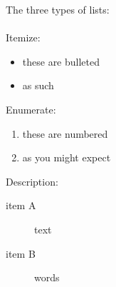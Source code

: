 \documentclass{article}
\begin{document}
The three types of lists:\\\\
Itemize:
\begin{itemize}
  \item these are bulleted
  \item as such
\end{itemize}
Enumerate:
\begin{enumerate}
  \item these are numbered
  \item as you might expect
\end{enumerate}
Description:
\begin{description}
  \item[item A] text 
  \item[item B] words 
\end{description}
\end{document}
